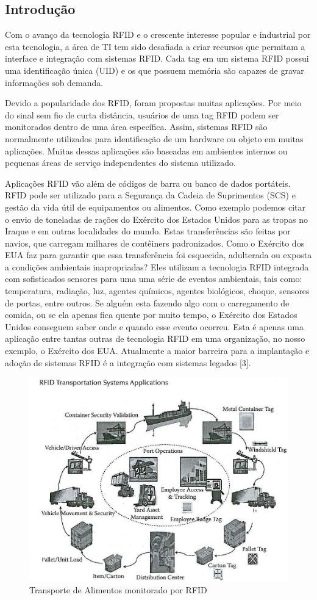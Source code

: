 

\subsection{Introdução}
		Com o avanço da tecnologia RFID e o crescente interesse popular e industrial por esta tecnologia, a área de TI tem sido desafiada a criar recursos que permitam a interface e integração com sistemas RFID. Cada tag em um sistema RFID possui uma identificação única (UID) e os que possuem memória são capazes de gravar informações sob demanda.
	
		Devido a popularidade dos RFID, foram propostas muitas aplicações. Por meio do sinal sem fio de curta distância, usuários de uma tag RFID podem ser monitorados dentro de uma área específica. Assim, sistemas RFID são normalmente utilizados para identificação de um hardware ou objeto em muitas aplicações. Muitas dessas aplicações são baseadas em ambientes internos ou pequenas áreas de serviço independentes do sistema utilizado.
	
		Aplicações RFID vão além de códigos de barra ou banco de dados portáteis. RFID pode ser utilizado para a Segurança da Cadeia de Suprimentos (SCS) e gestão da vida útil de equipamentos ou alimentos. Como exemplo podemos citar o envio de toneladas de rações do Exército dos Estados Unidos para as tropas no Iraque e em outras localidades do mundo. Estas transferências são feitas por navios, que carregam milhares de contêiners padronizados. Como o Exército dos EUA faz para garantir que essa transferência foi esquecida, adulterada ou exposta a condições ambientais inapropriadas? Eles utilizam a tecnologia RFID integrada com sofisticados sensores para uma uma série de eventos ambientais, tais como: temperatura, radiação, luz, agentes químicos, agentes biológicos, choque, sensores de portas, entre outros. Se alguém esta fazendo algo com o carregamento de comida, ou se ela apenas fica quente por muito tempo, o Exército dos Estados Unidos conseguem saber onde e quando esse evento ocorreu. Esta é apenas uma aplicação entre tantas outras de tecnologia RFID em uma organização, no nosso exemplo, o Exército dos EUA. Atualmente a maior barreira para a implantação e adoção de sistemas RFID é a integração com sistemas legados [3].
		
		
		\begin{figure}[h!]
			\centering
				\includegraphics[width=0.7\linewidth]{Ex1SCS.jpg}
			\caption{Transporte de Alimentos monitorado por RFID}
			\label{fig:Ex1SCS}
		\end{figure}
		
